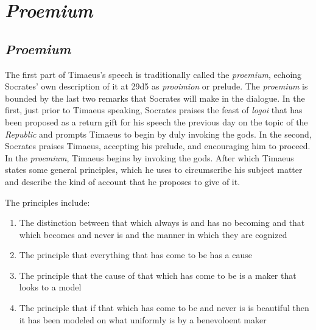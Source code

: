 
\chapter{\emph{Proemium}} %
\label{cha:proemium}

%
%


\section{\emph{Proemium}} %
\label{sec:proemium}

The first part of Timaeus's speech is traditionally called the \emph{proemium}, echoing Socrates' own description of it at 29d5 as \emph{prooimion} or prelude. The \emph{proemium} is bounded by the last two remarks that Socrates will make in the dialogue. In the first, just prior to Timaeus speaking, Socrates praises the feast of \emph{logoi} that has been proposed as a return gift for his speech the previous day on the topic of the \emph{Republic} and prompts Timaeus to begin by duly invoking the gods. In the second, Socrates praises Timaeus, accepting his prelude, and encouraging him to proceed. In the \emph{proemium}, Timaeus begins by invoking the gods. After which Timaeus states some general principles, which he uses to circumscribe his subject matter and describe the kind of account that he proposes to give of it. 

The principles include:
\begin{enumerate}[(1)]
	\item The distinction between that which always is and has no becoming and that which becomes and never is and the manner in which they are cognized
	\item The principle that everything that has come to be has a cause
	\item The principle that the cause of that which has come to be is a maker that looks to a model
	\item The principle that if that which has come to be and never is is beautiful then it has been modeled on what uniformly is by a benevoloent maker
\end{enumerate}

